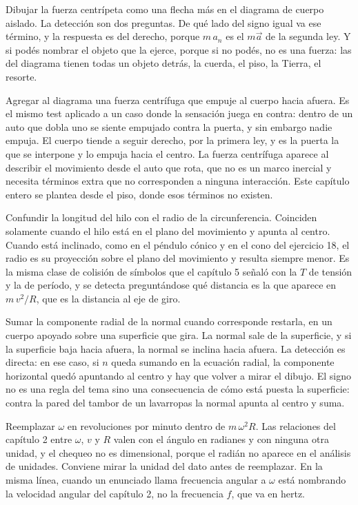 \documentclass[11pt,openany]{book}
\begin{document}
\begin{erroresComunes}
  \item Dibujar la fuerza centrípeta como una flecha más en el diagrama de cuerpo aislado. La detección son dos preguntas. De qué lado del signo igual va ese término, y la respuesta es del derecho, porque $m\,a_n$ es el $m\vec a$ de la segunda ley. Y si podés nombrar el objeto que la ejerce, porque si no podés, no es una fuerza: las del diagrama tienen todas un objeto detrás, la cuerda, el piso, la Tierra, el resorte.
  \item Agregar al diagrama una fuerza centrífuga que empuje al cuerpo hacia afuera. Es el mismo test aplicado a un caso donde la sensación juega en contra: dentro de un auto que dobla uno se siente empujado contra la puerta, y sin embargo nadie empuja. El cuerpo tiende a seguir derecho, por la primera ley, y es la puerta la que se interpone y lo empuja hacia el centro. La fuerza centrífuga aparece al describir el movimiento desde el auto que rota, que no es un marco inercial y necesita términos extra que no corresponden a ninguna interacción. Este capítulo entero se plantea desde el piso, donde esos términos no existen.
  \item Confundir la longitud del hilo con el radio de la circunferencia. Coinciden solamente cuando el hilo está en el plano del movimiento y apunta al centro. Cuando está inclinado, como en el péndulo cónico y en el cono del ejercicio 18, el radio es su proyección sobre el plano del movimiento y resulta siempre menor. Es la misma clase de colisión de símbolos que el capítulo 5 señaló con la $T$ de tensión y la de período, y se detecta preguntándose qué distancia es la que aparece en $m\,v^2/R$, que es la distancia al eje de giro.
  \item Sumar la componente radial de la normal cuando corresponde restarla, en un cuerpo apoyado sobre una superficie que gira. La normal sale de la superficie, y si la superficie baja hacia afuera, la normal se inclina hacia afuera. La detección es directa: en ese caso, si $n$ queda sumando en la ecuación radial, la componente horizontal quedó apuntando al centro y hay que volver a mirar el dibujo. El signo no es una regla del tema sino una consecuencia de cómo está puesta la superficie: contra la pared del tambor de un lavarropas la normal apunta al centro y suma.
  \item Reemplazar $\omega$ en revoluciones por minuto dentro de $m\,\omega^2 R$. Las relaciones del capítulo 2 entre $\omega$, $v$ y $R$ valen con el ángulo en radianes y con ninguna otra unidad, y el chequeo no es dimensional, porque el radián no aparece en el análisis de unidades. Conviene mirar la unidad del dato antes de reemplazar. En la misma línea, cuando un enunciado llama frecuencia angular a $\omega$ está nombrando la velocidad angular del capítulo 2, no la frecuencia $f$, que va en hertz.

\end{erroresComunes}
\end{document}
